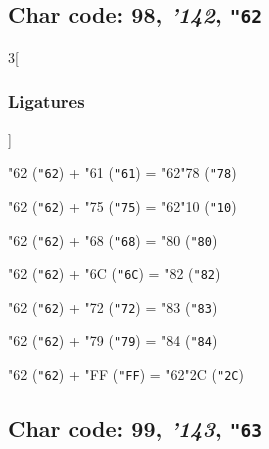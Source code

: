 \documentclass{article}
\newlength{\maxcharwidth}
\begin{document}
\subsection{Char code: 98, {\it'142}, {\tt"62}}
\label{char_98}


\begin{multicols}{3}[\subsubsection{Ligatures}]

{\testfont\char"62\noboundary} ({\tt"62}) + {\testfont\char"61\noboundary} ({\tt"61}) = {\testfont\char"62\noboundary}{\testfont\char"78\noboundary} ({\tt"78}) 

{\testfont\char"62\noboundary} ({\tt"62}) + {\testfont\char"75\noboundary} ({\tt"75}) = {\testfont\char"62\noboundary}{\testfont\char"10\noboundary} ({\tt"10}) 

{\testfont\char"62\noboundary} ({\tt"62}) + {\testfont\char"68\noboundary} ({\tt"68}) = {\testfont\char"80\noboundary} ({\tt"80}) 

{\testfont\char"62\noboundary} ({\tt"62}) + {\testfont\char"6C\noboundary} ({\tt"6C}) = {\testfont\char"82\noboundary} ({\tt"82}) 

{\testfont\char"62\noboundary} ({\tt"62}) + {\testfont\char"72\noboundary} ({\tt"72}) = {\testfont\char"83\noboundary} ({\tt"83}) 

{\testfont\char"62\noboundary} ({\tt"62}) + {\testfont\char"79\noboundary} ({\tt"79}) = {\testfont\char"84\noboundary} ({\tt"84}) 

{\testfont\char"62\noboundary} ({\tt"62}) + {\testfont\char"FF\noboundary} ({\tt"FF}) = {\testfont\char"62\noboundary}{\testfont\char"2C\noboundary} ({\tt"2C}) 

\end{multicols}

\subsection{Char code: 99, {\it'143}, {\tt"63}}
\label{char_99}
\end{document}
